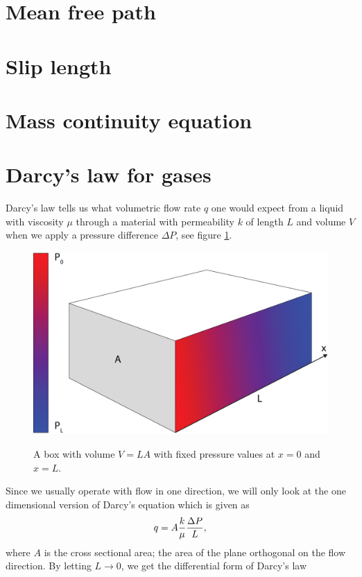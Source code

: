 \section{Mean free path}
\section{Slip length}
\section{Mass continuity equation}

\section{Darcy's law for gases}
Darcy's law tells us what volumetric flow rate $q$ one would expect from a liquid with viscosity $\mu$ through a material with permeability $k$ of length $L$ and volume $V$ when we apply a pressure difference $\Delta P$, see figure \ref{fig:darcys_law}. 
\begin{figure}[h]
\begin{center}
\includegraphics[width=\textwidth, trim=0cm 0cm 0cm 0cm, clip]{kinetic_theory/figures/darcy.eps}
\label{fig:darcys_law}
\end{center}
\caption{A box with volume $V=LA$ with fixed pressure values at $x=0$ and $x=L$.}
\end{figure}
Since we usually operate with flow in one direction, we will only look at the one dimensional version of Darcy's equation which is given as
\begin{align}
\label{eq:darcy_1}
	q = A{k\over \mu}{\Delta P\over L},
\end{align}
where $A$ is the cross sectional area; the area of the plane orthogonal on the flow direction. By letting $L\rightarrow 0$, we get the differential form of Darcy's law
